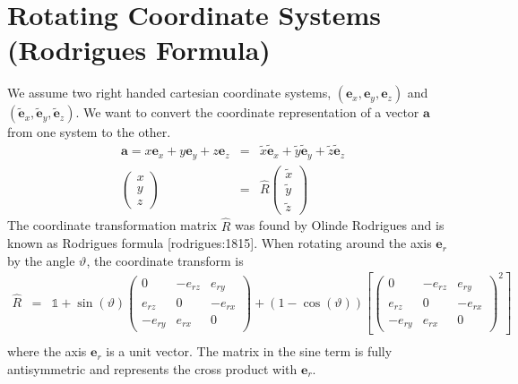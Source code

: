 \documentclass[12pt,a4paper,twoside,openright,BCOR10mm,headsepline,titlepage,abstracton,chapterprefix,final]{scrreprt}
\newcommand\Vector[1]{{\mathbf{#1}}}
\newcommand\unittensor{\mathds{1}}
\begin{document}
\section{Rotating Coordinate Systems (Rodrigues Formula)}
We assume two right handed cartesian coordinate systems,
$(\Vector{e}_x,\Vector{e}_y,\Vector{e}_z)$ and 
$(\tilde{\Vector{e}}_x,\tilde{\Vector{e}}_y,\tilde{\Vector{e}}_z)$.
We want to convert the coordinate representation of a vector $\Vector{a}$ from one system to the other.
\begin{eqnarray}
\Vector{a} = x \Vector{e}_x + y \Vector{e}_y + z \Vector{e}_z &=& \tilde{x} \tilde{\Vector{e}}_x + \tilde{y} \tilde{\Vector{e}}_y + \tilde{z} \tilde{\Vector{e}}_z
\\
\begin{pmatrix}  x \\ y \\ z \end{pmatrix}
&=&
\hat{R} \begin{pmatrix}  \tilde{x} \\ \tilde{y} \\ \tilde{z} \end{pmatrix}
\end{eqnarray}
The coordinate transformation matrix $\hat{R}$ was found by Olinde Rodrigues 
and is known as Rodrigues formula [rodrigues:1815].
When rotating around the axis $\Vector{e}_{r}$ by the angle $\vartheta$, the coordinate transform is
\begin{eqnarray}
    \hat{R} &=& 
    \unittensor + \sin(\vartheta)
      \begin{pmatrix}
        0    & -e_{rz} &  e_{ry} \\
        e_{rz} &     0 & -e_{rx} \\
        -e_{ry} &  e_{rx} &    0                                     
      \end{pmatrix}
    + (1 - \cos(\vartheta))
    \left[
      \begin{pmatrix}
        0    & -e_{rz} &  e_{ry} \\
        e_{rz} &     0 & -e_{rx} \\
        -e_{ry} &  e_{rx} &    0                                     
      \end{pmatrix}^2
    \right]\nonumber\\\label{eq:rodgrigues_formula}
\end{eqnarray}
where the axis $\Vector{e}_r$ is a unit vector.
The matrix in the sine term is fully antisymmetric and represents the cross product with $\Vector{e}_r$.
\end{document}
